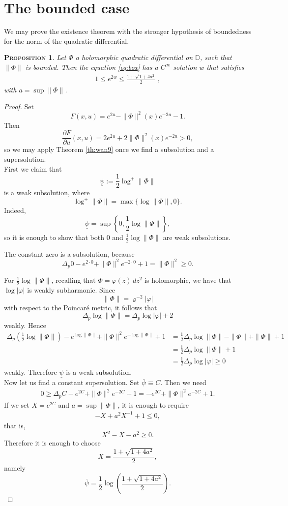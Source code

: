 \documentclass[a4paper,11pt,openright,twoside]{book}
\renewcommand{\rho}{\varrho}
\newcommand{\1}{\mathds{1}}
\theoremstyle{plain}
\newtheorem{prop}[thm]{\textsc{Proposition}}
\theoremstyle{definition}
\theoremstyle{remark}
\begin{document}
\section{The bounded case}
We may prove the existence theorem with the stronger hypothesis of boundedness for the norm of the quadratic differential. 
\begin{prop}\label{pr:exboundcase}
	Let $\Phi$ a holomorphic quadratic differential on $\mathbb{D}$, such that $\|\Phi\|$ is bounded. Then the equation \eqref{eq:box} has a $C^\infty$ solution $w$ that satisfies
	 \begin{align*}
		1\leq e^{2w} \leq \frac{1+\sqrt{1+4a^2}}{2}
	\ , 
	\end{align*}
	with $a=\sup\|\Phi\|$.
\end{prop}
\begin{proof}
Set
\[
F(x,u)=e^{2u}-\|\Phi\|^2(x)e^{-2u}-1.
\]
Then
\[
\frac{\partial F}{\partial u}(x,u)
=
2e^{2u}+2\|\Phi\|^2(x)e^{-2u}
>
0,
\]
so we may apply Theorem \ref{th:wan9} once we find a subsolution and a supersolution.\\

First we claim that
\[
\underline{\psi}:=\frac{1}{2}\log^+\|\Phi\|
\]
is a weak subsolution, where
\[
\log^+\|\Phi\|=\max\{\log\|\Phi\|,0\}.
\]
Indeed,
\[
\underline{\psi}=\sup\left\{0,\frac12\log\|\Phi\|\right\},
\]
so it is enough to show that both $0$ and $\frac12\log\|\Phi\|$ are weak subsolutions.

The constant zero is a subsolution, because
\[
\Delta_p 0-e^{2\cdot 0}+\|\Phi\|^2e^{-2\cdot 0}+1
=
\|\Phi\|^2
\geq 0.
\]

For $\frac12\log\|\Phi\|$, recalling that $\Phi=\varphi(z)\,dz^2$ is holomorphic, we have that $\log|\varphi|$ is weakly subharmonic. Since
\[
\|\Phi\|=\rho^{-2}|\varphi|
\]
with respect to the Poincaré metric, it follows that
\[
\Delta_p \log\|\Phi\|=\Delta_p \log|\varphi|+2
\]
weakly. Hence
\begin{align*}
\Delta_p\left(\frac12\log\|\Phi\|\right)
-e^{\log\|\Phi\|}
+\|\Phi\|^2e^{-\log\|\Phi\|}+1
&=
\frac12\Delta_p\log\|\Phi\|-\|\Phi\|+\|\Phi\|+1\\
&=
\frac12\Delta_p\log\|\Phi\|+1\\
&=
\frac12\Delta_p\log|\varphi|
\geq 0
\end{align*}
weakly. Therefore $\underline{\psi}$ is a weak subsolution.\\

Now let us find a constant supersolution. Set $\overline{\psi}\equiv C$. Then we need
\begin{align*}
0
\geq
\Delta_p C-e^{2C}+\|\Phi\|^2e^{-2C}+1
=
-e^{2C}+\|\Phi\|^2e^{-2C}+1.
\end{align*}
If we set $X=e^{2C}$ and $a=\sup\|\Phi\|$, it is enough to require
\begin{align*}
-X+a^2X^{-1}+1\leq 0,
\end{align*}
that is,
\[
X^2-X-a^2\geq 0.
\]
Therefore it is enough to choose
\[
X=\frac{1+\sqrt{1+4a^2}}{2},
\]
namely
\[
\overline{\psi}
=
\frac12\log\left(\frac{1+\sqrt{1+4a^2}}{2}\right).
\]


\end{proof}
\end{document}
